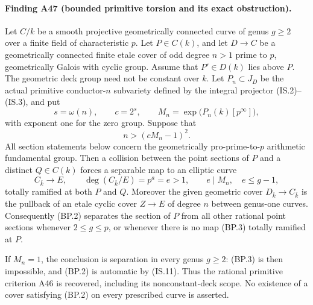 \documentclass[11pt,a4paper]{article}
\begin{document}
\paragraph{Finding A47 (bounded primitive torsion and its exact obstruction).}
Let $C/k$ be a smooth projective geometrically connected curve
of genus $g\ge2$ over a finite field of characteristic $p$.
Let $P\in C(k)$, and let $D\to C$ be a geometrically connected
finite etale cover of odd degree $n>1$ prime to $p$, geometrically
Galois with cyclic group. Assume that $P'\in D(k)$ lies above $P$.
The geometric deck group need not be constant over $k$.
Let $P_n\subset J_D$ be the actual primitive conductor-$n$
subvariety defined by the integral projector (IS.2)--(IS.3), and put
\[
 s=\omega(n),\qquad c=2^s,\qquad
 M_n=\exp\bigl(P_n(k)[p^\infty]\bigr),
 \tag{BP.1}
\]
with exponent one for the zero group. Suppose that
\[
                         n>(cM_n-1)^2.
 \tag{BP.2}
\]
All section statements below concern the geometrically
pro-prime-to-$p$ arithmetic fundamental group.
Then a collision between the point sections of $P$ and a distinct
$Q\in C(k)$ forces a separable map to an elliptic curve
\[
 C_{\bar k}\longrightarrow E,
 \qquad \deg(C_{\bar k}/E)=p^a=e>1,
 \qquad e\mid M_n,\quad e\le g-1,
 \tag{BP.3}
\]
totally ramified at both $P$ and $Q$. Moreover the given geometric
cover $D_{\bar k}\to C_{\bar k}$ is the pullback of an etale
cyclic cover $Z\to E$ of degree $n$ between genus-one curves.
Consequently (BP.2) separates the section of $P$ from all other
rational point sections whenever $2\le g\le p$, or whenever
there is no map (BP.3) totally ramified at $P$.

If $M_n=1$, the conclusion is separation in every genus
$g\ge2$: (BP.3) is then impossible, and (BP.2) is automatic
by (IS.11). Thus the rational primitive criterion A46 is
recovered, including its nonconstant-deck scope. No existence
of a cover satisfying (BP.2) on every prescribed curve is asserted.
\end{document}
